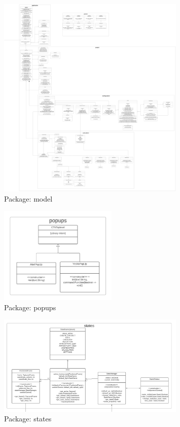 \documentclass[letterpaper,10pt,english]{sphinxmanual}
\begin{document}
\hypertarget{model}{
\begin{figure}[hbt!]
  \centering
\includegraphics[width=0.8\textwidth]
        {pictures/model.png}
  \caption{Package: model}
  \label{fig:mvc}
\end{figure}
}

\hypertarget{popups}{
\begin{figure}[hbt!]
  \centering
\includegraphics[width=0.5\textwidth]
        {pictures/popups.png}
  \caption{Package: popups}
  \label{fig:mvc}
\end{figure}
}

\hypertarget{states}{
\begin{figure}[hbt!]
  \centering
\includegraphics[width=0.8\textwidth]
        {pictures/states.png}
  \caption{Package: states}
  \label{fig:mvc}
\end{figure}
}
\end{document}
